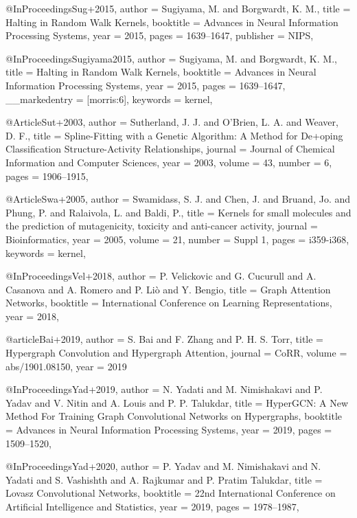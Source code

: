 @InProceedings{Sug+2015,
  author    = {Sugiyama, M. and Borgwardt, K. M.},
  title     = {Halting in Random Walk Kernels},
  booktitle = {Advances in Neural Information Processing Systems},
  year      = {2015},
  pages     = {1639--1647},
  publisher = {NIPS},
}

@InProceedings{Sugiyama2015,
  author        = {Sugiyama, M. and Borgwardt, K. M.},
  title         = {Halting in Random Walk Kernels},
  booktitle     = {Advances in Neural Information Processing Systems},
  year          = {2015},
  pages         = {1639--1647},
  __markedentry = {[morris:6]},
  keywords      = {kernel},
}

@Article{Sut+2003,
  author  = {Sutherland, J. J. and O'Brien, L. A. and Weaver, D. F.},
  title   = {Spline-Fitting with a Genetic Algorithm: {A} Method for De+oping Classification Structure-Activity Relationships},
  journal = {Journal of Chemical Information and Computer Sciences},
  year    = {2003},
  volume  = {43},
  number  = {6},
  pages   = {1906--1915},
}

@Article{Swa+2005,
  author   = {Swamidass, S. J. and Chen, J. and Bruand, Jo. and Phung, P. and Ralaivola, L. and Baldi, P.},
  title    = {Kernels for small molecules and the prediction of mutagenicity, toxicity and anti-cancer activity},
  journal  = {Bioinformatics},
  year     = {2005},
  volume   = {21},
  number   = {Suppl 1},
  pages    = {i359-i368},
  keywords = {kernel},
}

@InProceedings{Vel+2018,
  author    = {P. Velickovic and G. Cucurull and A. Casanova and A. Romero and P. Li{\`{o}} and Y. Bengio},
  title     = {Graph Attention Networks},
  booktitle = {International Conference on Learning Representations},
  year      = {2018},
}

@article{Bai+2019,
	author    = {S. Bai and
	F. Zhang and
	P. H. S. Torr},
	title     = {Hypergraph Convolution and Hypergraph Attention},
	journal   = {CoRR},
	volume    = {abs/1901.08150},
	year      = {2019}
}

@InProceedings{Yad+2019,
  author    = {N. Yadati and M. Nimishakavi and P. Yadav and V. Nitin and A. Louis and P. P. Talukdar},
  title     = {{HyperGCN:} {A} New Method For Training Graph Convolutional Networks on Hypergraphs},
  booktitle = {Advances in Neural Information Processing Systems},
  year      = {2019},
  pages     = {1509--1520},
}

@InProceedings{Yad+2020,
  author    = {P. Yadav and M. Nimishakavi and N. Yadati and S. Vashishth and A. Rajkumar and P. Pratim Talukdar},
  title     = {Lovasz Convolutional Networks},
  booktitle = {22nd International Conference on Artificial Intelligence and Statistics},
  year      = {2019},
  pages     = {1978--1987},
}

